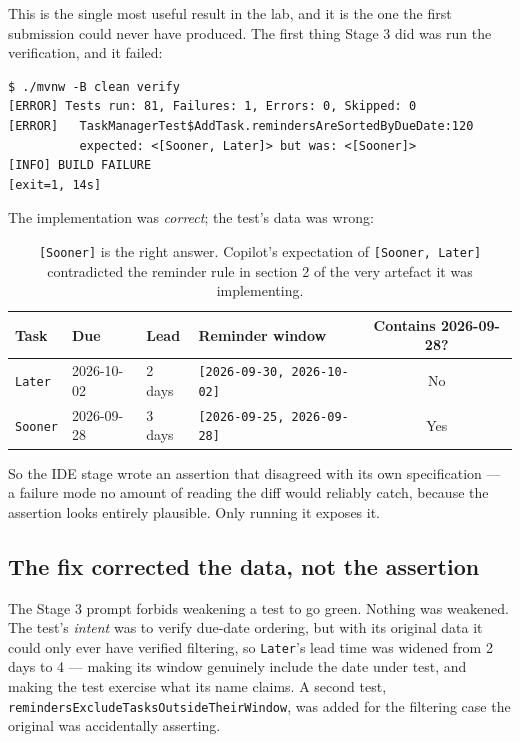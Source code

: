 \documentclass[11pt,a4paper]{article}
\newcommand{\code}[1]{\texttt{\small #1}}
\begin{document}
This is the single most useful result in the lab, and it is the one the first
submission could never have produced. The first thing Stage 3 did was run the
verification, and it failed:

\begin{lstlisting}[style=plain]
$ ./mvnw -B clean verify
[ERROR] Tests run: 81, Failures: 1, Errors: 0, Skipped: 0
[ERROR]   TaskManagerTest$AddTask.remindersAreSortedByDueDate:120
          expected: <[Sooner, Later]> but was: <[Sooner]>
[INFO] BUILD FAILURE
[exit=1, 14s]
\end{lstlisting}

\noindent The implementation was \emph{correct}; the test's data was wrong:

\begin{table}[h]
\centering
\small
\begin{tabular}{@{}l l l l c@{}}
\toprule
\textbf{Task} & \textbf{Due} & \textbf{Lead} & \textbf{Reminder window} & \textbf{Contains 2026-09-28?} \\
\midrule
\code{Later}  & 2026-10-02 & 2 days & \code{[2026-09-30, 2026-10-02]} & No \\
\code{Sooner} & 2026-09-28 & 3 days & \code{[2026-09-25, 2026-09-28]} & Yes \\
\bottomrule
\end{tabular}
\caption{\code{[Sooner]} is the right answer. Copilot's expectation of
\code{[Sooner, Later]} contradicted the reminder rule in section 2 of the very
artefact it was implementing.}
\end{table}

\noindent So the IDE stage wrote an assertion that disagreed with its own
specification --- a failure mode no amount of reading the diff would reliably
catch, because the assertion looks entirely plausible. Only running it exposes
it.

\subsection{The fix corrected the data, not the assertion}

The Stage 3 prompt forbids weakening a test to go green. Nothing was weakened.
The test's \emph{intent} was to verify due-date ordering, but with its original
data it could only ever have verified filtering, so \code{Later}'s lead time was
widened from 2 days to 4 --- making its window genuinely include the date under
test, and making the test exercise what its name claims. A second test,
\code{remindersExcludeTasksOutsideTheirWindow}, was added for the filtering case
the original was accidentally asserting.
\end{document}
